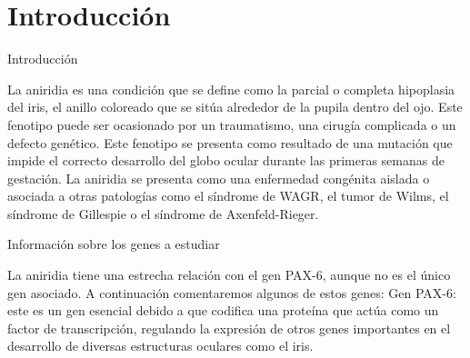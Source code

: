 \section{Introducción}

Introducción

La aniridia es una condición que se define como la parcial o completa hipoplasia del iris, el anillo coloreado que se sitúa alrededor de la pupila dentro del ojo. Este fenotipo puede ser ocasionado por un traumatismo, una cirugía complicada o un defecto genético. 
Este fenotipo se presenta como resultado de una mutación que impide el correcto desarrollo del globo ocular durante las primeras semanas de gestación. La aniridia se presenta como una enfermedad congénita aislada o asociada a otras patologías como el síndrome de WAGR, el tumor de Wilms, el síndrome de Gillespie o el síndrome de Axenfeld-Rieger.

Información sobre los genes a estudiar

La aniridia tiene una estrecha relación con el gen PAX-6, aunque no es el único gen asociado. A continuación comentaremos algunos de estos genes: 
Gen PAX-6: este es un gen esencial debido a que codifica una proteína que actúa como un factor de transcripción, regulando la expresión de otros genes importantes en el desarrollo de diversas estructuras oculares como el iris.

